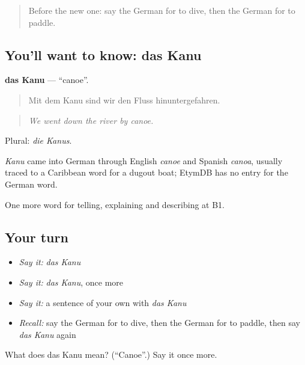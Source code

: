 \label{lesson:GE-C511-kanu}



\begin{quote}
Before the new one: say the German for to dive, then the German for to paddle.
\end{quote}

\subsection*{You'll want to know: das Kanu}
\textbf{das Kanu} — \textquotedblleft{}canoe\textquotedblright{}.

\begin{quote}
Mit dem Kanu sind wir den Fluss hinuntergefahren.
\end{quote}

\begin{quote}
\emph{We went down the river by canoe.}
\end{quote}

Plural: \emph{die Kanus}.

\begin{cousinweb}
\emph{Kanu} came into German through English \emph{canoe} and Spanish \emph{canoa}, usually traced to a Caribbean word for a dugout boat; EtymDB has no entry for the German word.
\end{cousinweb}

\begin{grammarlens}[title={What you've built}]
One more word for telling, explaining and describing at B1.
\end{grammarlens}

\subsection*{Your turn}
\begin{itemize}
\raggedright
  \item \emph{Say it:} \emph{das Kanu}
  \item \emph{Say it:} \emph{das Kanu}, once more
  \item \emph{Say it:} a sentence of your own with \emph{das Kanu}
  \item \emph{Recall:} say the German for to dive, then the German for to paddle, then say \emph{das Kanu} again
\end{itemize}

\begin{tcolorbox}[breakable,colback=teal!4,colframe=teal!35!black,title={Before you move on}]
What does das Kanu mean? (\textquotedblleft{}Canoe\textquotedblright{}.) Say it once more.
\end{tcolorbox}
